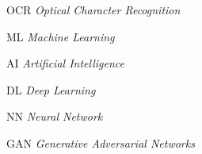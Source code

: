\begin{siglas}
  \item[OCR] \textit{Optical Character Recognition}
  \item[ML] \textit{Machine Learning}
  \item[AI] \textit{Artificial Intelligence}
  \item[DL] \textit{Deep Learning}
  \item[NN] \textit{Neural Network}
  \item[GAN] \textit{Generative Adversarial Networks}
\end{siglas}
